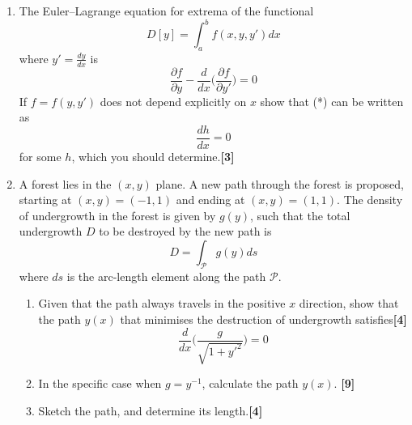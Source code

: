 \documentclass[a4paper]{article}
\begin{document}
\newpage
\begin{qns}\leavevmode
\begin{enumerate}[label=(\alph*)]
\item The Euler–Lagrange equation for extrema of the functional
$$D[y]=\int_a^bf(x,y,y')dx$$
where $y'=\frac{dy}{dx}$ is
\begin{equation}
\frac{\partial f}{\partial y}-\frac{d}{dx}\bigg(\frac{\partial f}{\partial y'}\bigg)=0\tag{*}
\end{equation}
If $f = f(y, y')$ does not depend explicitly on $x$ show that (*) can be written as
$$\frac{dh}{dx}=0$$
for some $h$, which you should determine.\hfill\textbf{[3]}
\item A forest lies in the $(x, y)$ plane. A new path through the forest is proposed, starting at $(x, y) = (−1, 1)$ and ending at $(x, y) = (1, 1)$. The density of undergrowth in the forest is given by $g(y)$, such that the total undergrowth $D$ to be destroyed by the new path is
$$D=\int_{\mathcal{P}}g(y)ds$$
where $ds$ is the arc-length element along the path $\mathcal{P}$.
\begin{enumerate}[label=(\roman*)]
\item Given that the path always travels in the positive $x$ direction, show that the path $y(x)$ that minimises the destruction of undergrowth satisfies\hfill\textbf{[4]}
$$\frac{d}{dx}\bigg(\frac{g}{\sqrt{1+y'^2}}\bigg)=0$$
\item In the specific case when $g=y^{-1}$, calculate the path $y(x)$. \hfill\textbf{[9]}
\item Sketch the path, and determine its length.\hfill\textbf{[4]}
\end{enumerate}
\end{enumerate}
\end{qns}
\end{document}
